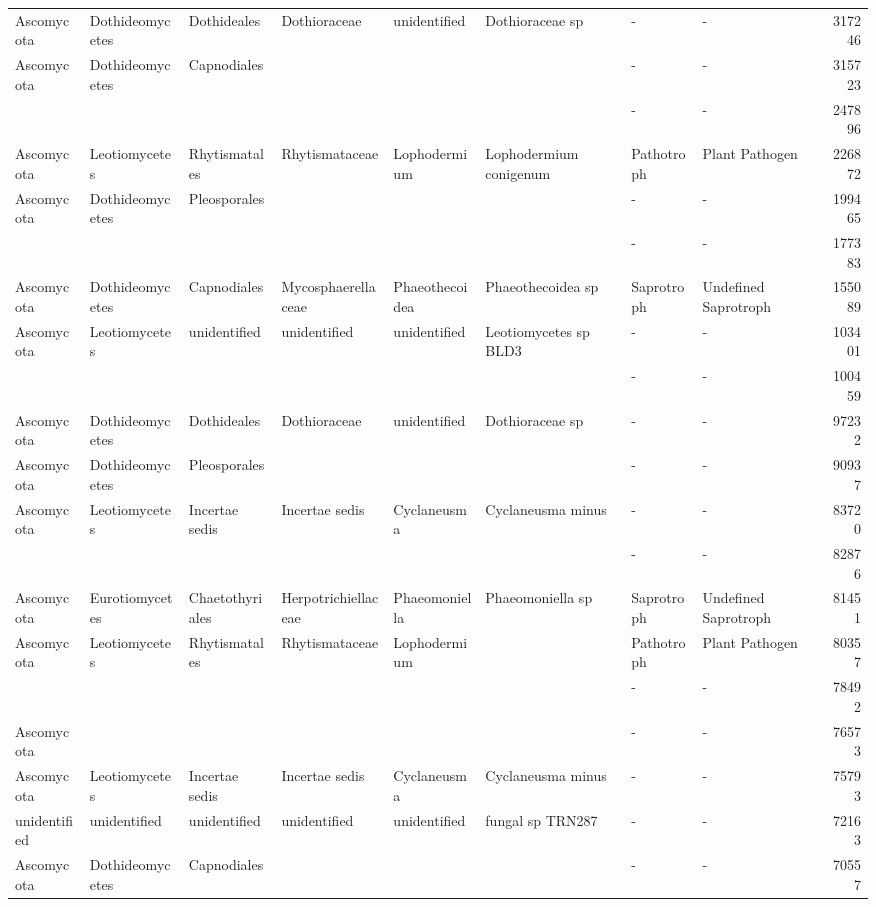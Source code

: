 \documentclass[12pt]{article}\usepackage[]{graphicx}\usepackage[]{color}
\numberwithin{figure}{section}
\begin{document}
\begin{landscape}
\begin{table}[ht]
\begin{tabular}{llllllllr}
  Ascomycota & Dothideomycetes & Dothideales & Dothioraceae & unidentified & Dothioraceae sp & - & - & 317246 \\ 
  Ascomycota & Dothideomycetes & Capnodiales &  &  &  & - & - & 315723 \\ 
   &  &  &  &  &  & - & - & 247896 \\ 
  Ascomycota & Leotiomycetes & Rhytismatales & Rhytismataceae & Lophodermium & Lophodermium conigenum & Pathotroph & Plant Pathogen & 226872 \\ 
  Ascomycota & Dothideomycetes & Pleosporales &  &  &  & - & - & 199465 \\ 
   &  &  &  &  &  & - & - & 177383 \\ 
  Ascomycota & Dothideomycetes & Capnodiales & Mycosphaerellaceae & Phaeothecoidea & Phaeothecoidea sp & Saprotroph & Undefined Saprotroph & 155089 \\ 
  Ascomycota & Leotiomycetes & unidentified & unidentified & unidentified & Leotiomycetes sp BLD3 & - & - & 103401 \\ 
   &  &  &  &  &  & - & - & 100459 \\ 
  Ascomycota & Dothideomycetes & Dothideales & Dothioraceae & unidentified & Dothioraceae sp & - & - & 97232 \\ 
  Ascomycota & Dothideomycetes & Pleosporales &  &  &  & - & - & 90937 \\ 
  Ascomycota & Leotiomycetes & Incertae sedis & Incertae sedis & Cyclaneusma & Cyclaneusma minus & - & - & 83720 \\ 
   &  &  &  &  &  & - & - & 82876 \\ 
  Ascomycota & Eurotiomycetes & Chaetothyriales & Herpotrichiellaceae & Phaeomoniella & Phaeomoniella sp & Saprotroph & Undefined Saprotroph & 81451 \\ 
  Ascomycota & Leotiomycetes & Rhytismatales & Rhytismataceae & Lophodermium &  & Pathotroph & Plant Pathogen & 80357 \\ 
   &  &  &  &  &  & - & - & 78492 \\ 
  Ascomycota &  &  &  &  &  & - & - & 76573 \\ 
  Ascomycota & Leotiomycetes & Incertae sedis & Incertae sedis & Cyclaneusma & Cyclaneusma minus & - & - & 75793 \\ 
  unidentified & unidentified & unidentified & unidentified & unidentified & fungal sp TRN287 & - & - & 72163 \\ 
  Ascomycota & Dothideomycetes & Capnodiales &  &  &  & - & - & 70557 \\ 

\end{tabular}
\end{table}
\end{landscape}
\end{document}
